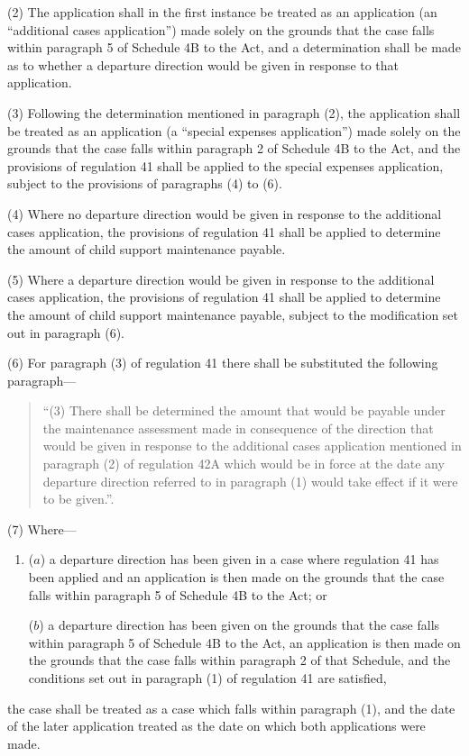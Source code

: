 \documentclass[12pt,a4paper]{article}
\begin{document}
(2) The application shall in the first instance be treated as an application (an “additional cases application”) made solely on the grounds that the case falls within paragraph 5 of Schedule 4B to the Act, and a determination shall be made as to whether a departure direction would be given in response to that application.

(3) Following the determination mentioned in paragraph (2), the application shall be treated as an application (a “special expenses application”) made solely on the grounds that the case falls within paragraph 2 of Schedule 4B to the Act, and the provisions of regulation 41 shall be applied to the special expenses application, subject to the provisions of paragraphs (4) to (6).

(4) Where no departure direction would be given in response to the additional cases application, the provisions of regulation 41 shall be applied to determine the amount of child support maintenance payable.

(5) Where a departure direction would be given in response to the additional cases application, the provisions of regulation 41 shall be applied to determine the amount of child support maintenance payable, subject to the modification set out in paragraph (6).

(6) For paragraph (3) of regulation 41 there shall be substituted the following paragraph—
\begin{quotation}
“(3) There shall be determined the amount that would be payable under the maintenance assessment made in consequence of the direction that would be given in response to the additional cases application mentioned in paragraph (2) of regulation 42A which would be in force at the date any departure direction referred to in paragraph (1) would take effect if it were to be given.”.
\end{quotation}

(7) Where—
\begin{enumerate}\item[]
($a$) a departure direction has been given in a case where regulation 41 has been applied and an application is then made on the grounds that the case falls within paragraph 5 of Schedule 4B to the Act; or

($b$) a departure direction has been given on the grounds that the case falls within paragraph 5 of Schedule 4B to the Act, an application is then made on the grounds that the case falls within paragraph 2 of that Schedule, and the conditions set out in paragraph (1) of regulation 41 are satisfied,
\end{enumerate}
the case shall be treated as a case which falls within paragraph (1), and the date of the later application treated as the date on which both applications were made.
\end{document}
